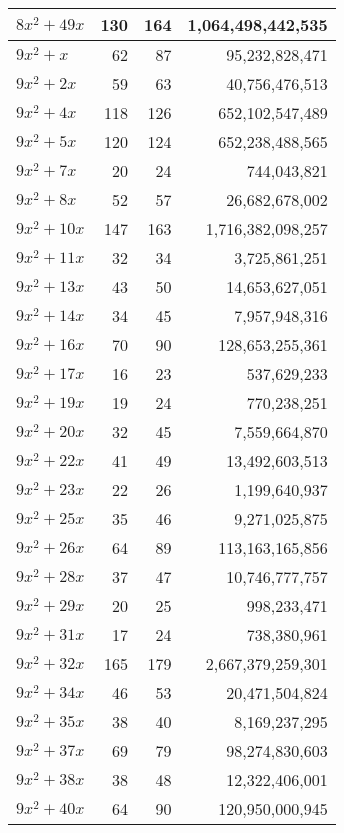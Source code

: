 \documentclass[a4paper]{amsproc}
\theoremstyle{plain}
\theoremstyle{named}
\begin{document}
\begin{longtable}{ | l | r | r | r | }
$8x^2 + 49x$ & 130 & 164 & 1{,}064{,}498{,}442{,}535 \\ \hline
$9x^2 + x$ & 62 & 87 & 95{,}232{,}828{,}471 \\ \hline
$9x^2 + 2x$ & 59 & 63 & 40{,}756{,}476{,}513 \\ \hline
$9x^2 + 4x$ & 118 & 126 & 652{,}102{,}547{,}489 \\ \hline
$9x^2 + 5x$ & 120 & 124 & 652{,}238{,}488{,}565 \\ \hline
$9x^2 + 7x$ & 20 & 24 & 744{,}043{,}821 \\ \hline
$9x^2 + 8x$ & 52 & 57 & 26{,}682{,}678{,}002 \\ \hline
$9x^2 + 10x$ & 147 & 163 & 1{,}716{,}382{,}098{,}257 \\ \hline
$9x^2 + 11x$ & 32 & 34 & 3{,}725{,}861{,}251 \\ \hline
$9x^2 + 13x$ & 43 & 50 & 14{,}653{,}627{,}051 \\ \hline
$9x^2 + 14x$ & 34 & 45 & 7{,}957{,}948{,}316 \\ \hline
$9x^2 + 16x$ & 70 & 90 & 128{,}653{,}255{,}361 \\ \hline
$9x^2 + 17x$ & 16 & 23 & 537{,}629{,}233 \\ \hline
$9x^2 + 19x$ & 19 & 24 & 770{,}238{,}251 \\ \hline
$9x^2 + 20x$ & 32 & 45 & 7{,}559{,}664{,}870 \\ \hline
$9x^2 + 22x$ & 41 & 49 & 13{,}492{,}603{,}513 \\ \hline
$9x^2 + 23x$ & 22 & 26 & 1{,}199{,}640{,}937 \\ \hline
$9x^2 + 25x$ & 35 & 46 & 9{,}271{,}025{,}875 \\ \hline
$9x^2 + 26x$ & 64 & 89 & 113{,}163{,}165{,}856 \\ \hline
$9x^2 + 28x$ & 37 & 47 & 10{,}746{,}777{,}757 \\ \hline
$9x^2 + 29x$ & 20 & 25 & 998{,}233{,}471 \\ \hline
$9x^2 + 31x$ & 17 & 24 & 738{,}380{,}961 \\ \hline
$9x^2 + 32x$ & 165 & 179 & 2{,}667{,}379{,}259{,}301 \\ \hline
$9x^2 + 34x$ & 46 & 53 & 20{,}471{,}504{,}824 \\ \hline
$9x^2 + 35x$ & 38 & 40 & 8{,}169{,}237{,}295 \\ \hline
$9x^2 + 37x$ & 69 & 79 & 98{,}274{,}830{,}603 \\ \hline
$9x^2 + 38x$ & 38 & 48 & 12{,}322{,}406{,}001 \\ \hline
$9x^2 + 40x$ & 64 & 90 & 120{,}950{,}000{,}945 \\ \hline

\end{longtable}
\end{document}
